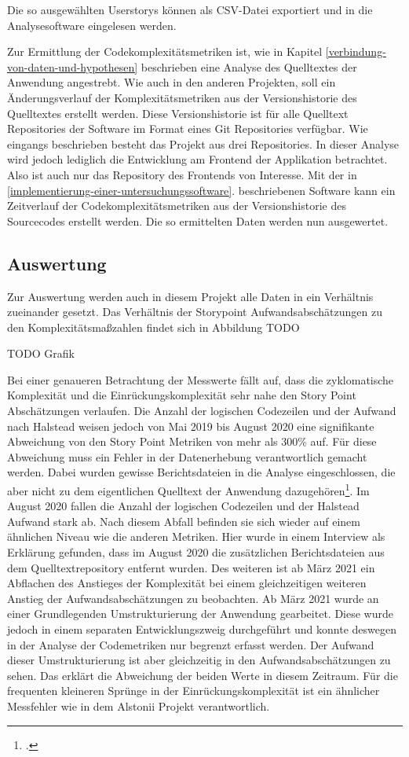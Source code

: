 Die so ausgewählten Userstorys können als \ac{CSV}-Datei exportiert und in
die Analysesoftware eingelesen werden.

Zur Ermittlung der Codekomplexitätsmetriken ist, wie in Kapitel \ref{verbindung-von-daten-und-hypothesen}
beschrieben eine Analyse des Quelltextes der Anwendung angestrebt. Wie
auch in den anderen Projekten, soll ein Änderungsverlauf der
Komplexitätsmetriken aus der Versionshistorie des Quelltextes erstellt
werden. Diese Versionshistorie ist für alle Quelltext Repositories der
Software im Format eines Git Repositories verfügbar. Wie eingangs
beschrieben besteht das Projekt aus drei Repositories. In dieser Analyse
wird jedoch lediglich die Entwicklung am Frontend der Applikation
betrachtet. Also ist auch nur das Repository des Frontends von
Interesse. Mit der in \ref{implementierung-einer-untersuchungssoftware}. beschriebenen Software kann ein Zeitverlauf
der Codekomplexitätsmetriken aus der Versionshistorie des Sourcecodes
erstellt werden. Die so ermittelten Daten werden nun ausgewertet.

\subsection{Auswertung}\label{engelmannii-Auswertung}

Zur Auswertung werden auch in diesem Projekt alle Daten in ein
Verhältnis zueinander gesetzt. Das Verhältnis der Storypoint
Aufwandsabschätzungen zu den Komplexitätsmaßzahlen findet sich in
Abbildung TODO

TODO Grafik

Bei einer genaueren Betrachtung der Messwerte fällt auf, dass die
zyklomatische Komplexität und die Einrückungskomplexität sehr nahe den
Story Point Abschätzungen verlaufen. Die Anzahl der logischen Codezeilen
und der Aufwand nach Halstead weisen jedoch von Mai 2019 bis August 2020
eine signifikante Abweichung von den Story Point Metriken von mehr als
300\% auf. Für diese Abweichung muss ein Fehler in der Datenerhebung
verantwortlich gemacht werden. Dabei wurden gewisse Berichtsdateien in
die Analyse eingeschlossen, die aber nicht zu dem eigentlichen Quelltext
der Anwendung dazugehören\footcite[Vgl. ][]{stakeholdernInterviewMitStakeholdern2022}. Im August 2020
fallen die Anzahl der logischen Codezeilen und der Halstead Aufwand
stark ab. Nach diesem Abfall befinden sie sich wieder auf einem
ähnlichen Niveau wie die anderen Metriken. Hier wurde in einem Interview
als Erklärung gefunden, dass im August 2020 die zusätzlichen
Berichtsdateien aus dem Quelltextrepository entfernt wurden. Des
weiteren ist ab März 2021 ein Abflachen des Anstieges der Komplexität
bei einem gleichzeitigen weiteren Anstieg der Aufwandsabschätzungen zu
beobachten. Ab März 2021 wurde an einer Grundlegenden Umstrukturierung
der Anwendung gearbeitet. Diese wurde jedoch in einem separaten
Entwicklungszweig durchgeführt und konnte deswegen in der Analyse der
Codemetriken nur begrenzt erfasst werden. Der Aufwand dieser
Umstrukturierung ist aber gleichzeitig in den Aufwandsabschätzungen zu
sehen. Das erklärt die Abweichung der beiden Werte in diesem Zeitraum.
Für die frequenten kleineren Sprünge in der Einrückungskomplexität ist
ein ähnlicher Messfehler wie in dem Alstonii Projekt verantwortlich.

